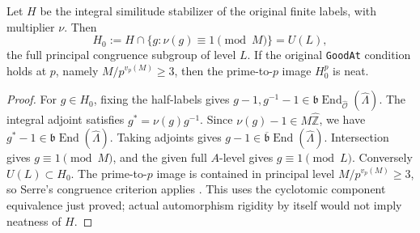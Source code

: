 \begin{corollary}
\label{cor:original-neat-level}
Let $H$ be the integral similitude stabilizer of the original finite
labels, with multiplier $\nu$.  Then
\[
 H_0:=H\cap\{g:\nu(g)\equiv1\pmod M\}
       =U(L),
\]
the full principal congruence subgroup of level $L$.  If the original
\texttt{GoodAt} condition holds at $p$, namely
$M/p^{v_p(M)}\geq3$, then the prime-to-$p$ image $H_0^p$ is neat.
\end{corollary}
\begin{proof}
For $g\in H_0$, fixing the half-labels gives
$g-1,g^{-1}-1\in\mathfrak b\operatorname{End}_{\widehat{\mathcal O}}
(\widehat\Lambda)$.  The integral adjoint satisfies
$g^*=\nu(g)g^{-1}$.  Since $\nu(g)-1\in M\widehat{\mathbb Z}$,
we have $g^*-1\in\mathfrak b\operatorname{End}(\widehat\Lambda)$.
Taking adjoints gives
$g-1\in\overline{\mathfrak b}\operatorname{End}(\widehat\Lambda)$.
Intersection gives $g\equiv1\pmod M$, and the given full $A$-level
gives $g\equiv1\pmod L$.  Conversely $U(L)\subset H_0$.
The prime-to-$p$ image is contained in principal level
$M/p^{v_p(M)}\geq3$, so Serre's congruence criterion applies
\cite[Remark 1.4.1.9]{integral-pel-lan}.
This uses the cyclotomic component equivalence just proved; actual
automorphism rigidity by itself would not imply neatness of $H$.
\end{proof}

